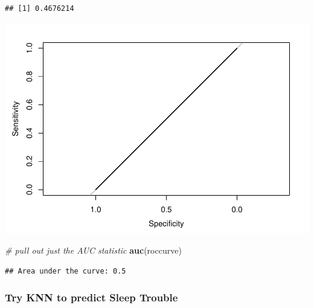 \documentclass[]{article}
\newenvironment{Shaded}{\begin{snugshade}}{\end{snugshade}}
\newcommand{\KeywordTok}[1]{\textcolor[rgb]{0.13,0.29,0.53}{\textbf{{#1}}}}
\newcommand{\StringTok}[1]{\textcolor[rgb]{0.31,0.60,0.02}{{#1}}}
\newcommand{\CommentTok}[1]{\textcolor[rgb]{0.56,0.35,0.01}{\textit{{#1}}}}
\newcommand{\NormalTok}[1]{{#1}}
\begin{document}
\begin{verbatim}
## [1] 0.4676214
\end{verbatim}

\begin{Shaded}
\end{Shaded}

\includegraphics{Hmwk7AnswerKey_files/figure-latex/unnamed-chunk-8-2.pdf}

\begin{Shaded}
\begin{Highlighting}[]
\CommentTok{# pull out just the AUC statistic}
\KeywordTok{auc}\NormalTok{(roccurve)}
\end{Highlighting}
\end{Shaded}

\begin{verbatim}
## Area under the curve: 0.5
\end{verbatim}

\subsubsection{Try KNN to predict Sleep
Trouble}\label{try-knn-to-predict-sleep-trouble}
\end{document}
